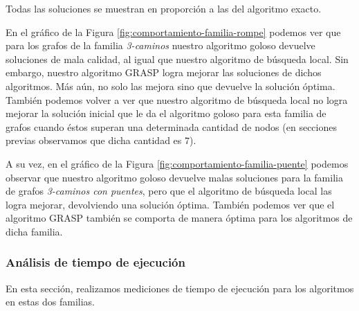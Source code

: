 Todas las soluciones se muestran en proporción a las del algoritmo exacto.

En el gráfico de la Figura \ref{fig:comportamiento-familia-rompe} podemos ver que para los grafos de la familia \emph{3-caminos} nuestro algoritmo goloso devuelve soluciones de mala calidad, al igual que nuestro algoritmo de búsqueda local. Sin embargo, nuestro algoritmo GRASP logra mejorar las soluciones de dichos algoritmos. Más aún, no solo las mejora sino que devuelve la solución óptima. También podemos volver a ver que nuestro algoritmo de búsqueda local no logra mejorar la solución inicial que le da el algoritmo goloso para esta familia de grafos cuando éstos superan una determinada cantidad de nodos (en secciones previas observamos que dicha cantidad es $7$).

A su vez, en el gráfico de la Figura \ref{fig:comportamiento-familia-puente} podemos observar que nuestro algoritmo goloso devuelve malas soluciones para la familia de grafos \emph{3-caminos con puentes}, pero que el algoritmo de búsqueda local las logra mejorar, devolviendo una solución óptima. También podemos ver que el algoritmo GRASP también se comporta de manera óptima para los algoritmos de dicha familia.

\subsubsection{Análisis de tiempo de ejecución}

En esta sección, realizamos mediciones de tiempo de ejecución para los algoritmos en estas dos familias.

